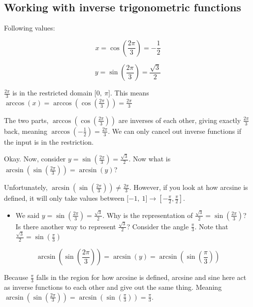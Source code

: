 \documentclass[
]{article}
\begin{document}
\subsection{Working with inverse trigonometric
functions}

Following values:

$$x = \cos\left( \frac{2\pi}{3} \right) = - \frac{1}{2}$$

$$y = \sin\left( \frac{2\pi}{3} \right) = \frac{\sqrt{3}}{2}$$

$\frac{2\pi}{3}$ is in the restricted domain
$\lbrack 0,\ \pi\rbrack$. This means
$\arccos(x) = \arccos\left( \cos\left( \frac{2\pi}{3} \right) \right) = \frac{2\pi}{3}$

The two parts,
$\arccos\left( \cos\left( \frac{2\pi}{3} \right) \right)$ are inverses
of each other, giving exactly $\frac{2\pi}{3}$ back, meaning
$\arccos\left( - \frac{1}{2} \right) = \frac{2\pi}{3}$. We can only
cancel out inverse functions if the input is in the restriction.

Okay. Now, consider
$y = \sin\left( \frac{2\pi}{3} \right) = \frac{\sqrt{3}}{2}$. Now what
is
$\arcsin\left( \sin\left( \frac{2\pi}{3} \right) \right) = \arcsin(y)$?

Unfortunately,
$\arcsin\left( \sin\left( \frac{2\pi}{3} \right) \right) \neq \frac{2\pi}{3}$.
However, if you look at how arcsine is defined, it will only take values
between
$\lbrack - 1,\ 1\rbrack \rightarrow \left\lbrack - \frac{\pi}{2},\frac{\pi}{2} \right\rbrack$.

\begin{itemize}
\item
  We said
  $y = \sin\left( \frac{2\pi}{3} \right) = \frac{\sqrt{3}}{2}$. Why is
  the representation of
  $\frac{\sqrt{3}}{2} = \sin\left( \frac{2\pi}{3} \right)$? Is there
  another way to represent $\frac{\sqrt{3}}{2}$? Consider the angle
  $\frac{\pi}{3}$. Note that
  $\frac{\sqrt{3}}{2} = \sin\left( \frac{\pi}{3} \right)$
\end{itemize}

$$\arcsin\left( \sin\left( \frac{2\pi}{3} \right) \right) = \arcsin(y) = \arcsin\left( \sin\left( \frac{\pi}{3} \right) \right)$$

Because $\frac{\pi}{3}$ falls in the region for how arcsine is
defined, arcsine and sine here act as inverse functions to each other
and give out the same thing. Meaning
$\arcsin\left( \sin\left( \frac{2\pi}{3} \right) \right) = \arcsin\left( \sin\left( \frac{\pi}{3} \right) \right) = \frac{\pi}{3}$.
\end{document}
